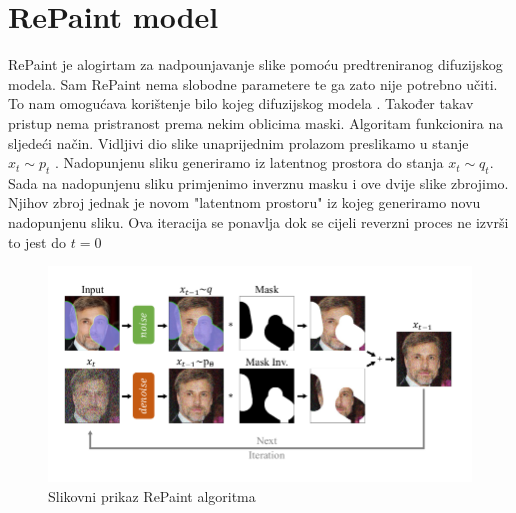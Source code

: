 \documentclass[10pt, a4paper, croatian]{article}
\begin{document}
\section{RePaint model}
RePaint je alogirtam za nadpounjavanje slike pomoću predtreniranog difuzijskog modela. Sam RePaint nema slobodne parametere te ga zato nije
potrebno učiti. To nam omogućava korištenje bilo kojeg difuzijskog modela \cite{repaint}. Također takav pristup nema pristranost prema nekim oblicima maski.
Algoritam funkcionira na sljedeći način. Vidljivi dio slike unaprijednim prolazom preslikamo u stanje $x_t \sim p_t$ . Nadopunjenu sliku 
generiramo iz latentnog prostora do stanja $x_t \sim q_t$. Sada na nadopunjenu sliku primjenimo inverznu masku i ove dvije slike zbrojimo. 
Njihov zbroj jednak je novom "latentnom prostoru" iz kojeg generiramo novu nadopunjenu sliku. Ova iteracija se ponavlja dok se cijeli reverzni
proces ne izvrši to jest do $t = 0$
\begin{figure}
	\begin{center}
	\includegraphics[width=\columnwidth]{images/repaint.png}
	\caption{Slikovni prikaz RePaint algoritma \cite{repaint}}
	\label{fig:figure2}
	\end{center}
\end{figure}
\end{document}
